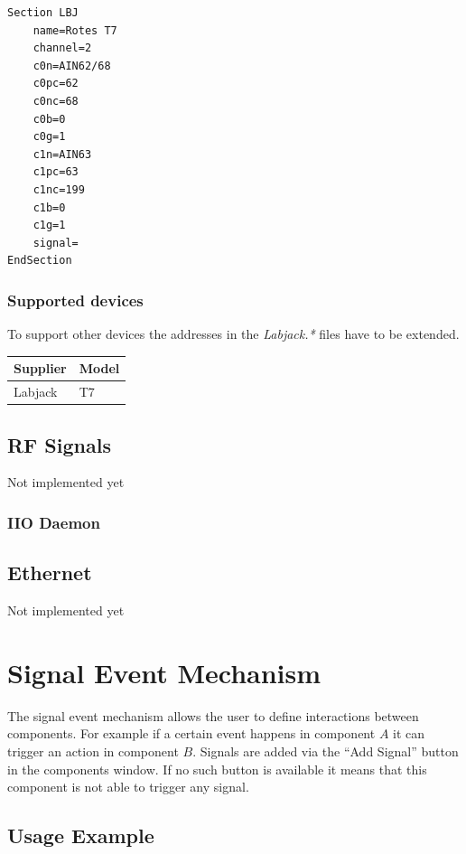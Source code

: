 \documentclass[10pt,a4paper]{article}
\begin{document}
\begin{lstlisting}
Section LBJ
	name=Rotes T7
	channel=2
	c0n=AIN62/68
	c0pc=62
	c0nc=68
	c0b=0
	c0g=1
	c1n=AIN63
	c1pc=63
	c1nc=199
	c1b=0
	c1g=1
	signal=
EndSection
\end{lstlisting}
	
		\subsubsection{Supported devices}
		To support other devices the addresses in the \textit{Labjack.*} files have to be extended.
	
		\begin{table}[H]
		\centering
		\begin{tabular}{ll}
		\toprule
		Supplier			& Model \\ \midrule
		Labjack				& T7 \\
		\bottomrule
		\end{tabular}			
		\end{table}	

	\subsection{RF Signals}
	Not implemented yet
	
		\subsubsection{IIO Daemon}
		
	\subsection{Ethernet}
	Not implemented yet

\section{Signal Event Mechanism}
\label{c:signal_event_mechanism}

The signal event mechanism allows the user to define interactions between components. For example if a certain event happens in component $A$ it can trigger an action in component $B$. Signals are added via the \enquote{Add Signal} button in the components window. If no such button is available it means that this component is not able to trigger any signal.

	\subsection{Usage Example}
	
\end{document}
